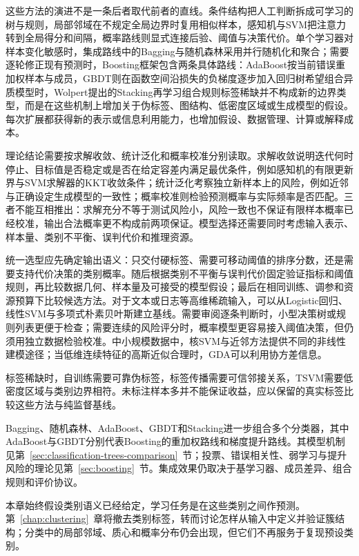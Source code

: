 这些方法的演进不是一条后者取代前者的直线。条件结构把人工判断拆成可学习的树与规则，局部邻域在不规定全局边界时复用相似样本，感知机与SVM把注意力转到全局得分和间隔，概率路线则显式连接后验、阈值与决策代价。单个学习器对样本变化敏感时，集成路线中的Bagging与随机森林采用并行随机化和聚合；需要逐轮修正现有预测时，Boosting框架包含两条具体路线：AdaBoost按当前错误重加权样本与成员，GBDT则在函数空间沿损失的负梯度逐步加入回归树希望组合异质模型时，Wolpert提出的Stacking再学习组合规则标签稀缺并不构成新的边界类型，而是在这些机制上增加关于伪标签、图结构、低密度区域或生成模型的假设。每次扩展都获得新的表示或信息利用能力，也增加假设、数据管理、计算或解释成本。

理论结论需要按求解收敛、统计泛化和概率校准分别读取。求解收敛说明迭代何时停止、目标值是否稳定或是否在给定容差内满足最优条件，例如感知机的有限更新界与SVM求解器的KKT收敛条件；统计泛化考察独立新样本上的风险，例如近邻与正确设定生成模型的一致性；概率校准则检验预测概率与实际频率是否匹配。三者不能互相推出：求解充分不等于测试风险小，风险一致也不保证有限样本概率已经校准，输出合法概率更不构成前两项保证。模型选择还需要同时考虑输入表示、样本量、类别不平衡、误判代价和推理资源。

统一选型应先确定输出语义：只交付硬标签、需要可移动阈值的排序分数，还是需要支持代价决策的类别概率。随后根据类别不平衡与误判代价固定验证指标和阈值规则，再比较数据几何、样本量及可接受的模型假设；最后在相同训练、调参和资源预算下比较候选方法。对于文本或日志等高维稀疏输入，可以从Logistic回归、线性SVM与多项式朴素贝叶斯建立基线。需要审阅逐条判断时，小型决策树或规则列表更便于检查；需要连续的风险评分时，概率模型更容易接入阈值决策，但仍须用独立数据检验校准。中小规模数据中，核SVM与近邻方法提供不同的非线性建模途径；当低维连续特征的高斯近似合理时，GDA可以利用协方差信息。

标签稀缺时，自训练需要可靠伪标签，标签传播需要可信邻接关系，TSVM需要低密度区域与类别边界相符。未标注样本多并不能保证收益，应以保留的真实标签比较这些方法与纯监督基线。

Bagging、随机森林、AdaBoost、GBDT和Stacking进一步组合多个分类器，其中AdaBoost与GBDT分别代表Boosting的重加权路线和梯度提升路线。其模型机制见第~\ref{sec:classification-trees-comparison}~节；投票、错误相关性、弱学习与提升风险的理论见第~\ref{sec:boosting}~节。集成效果仍取决于基学习器、成员差异、组合规则和评价协议。

本章始终假设类别语义已经给定，学习任务是在这些类别之间作预测。第~\ref{chap:clustering}~章将撤去类别标签，转而讨论怎样从输入中定义并验证簇结构；分类中的局部邻域、质心和概率分布仍会出现，但它们不再服务于复现预设类别。
